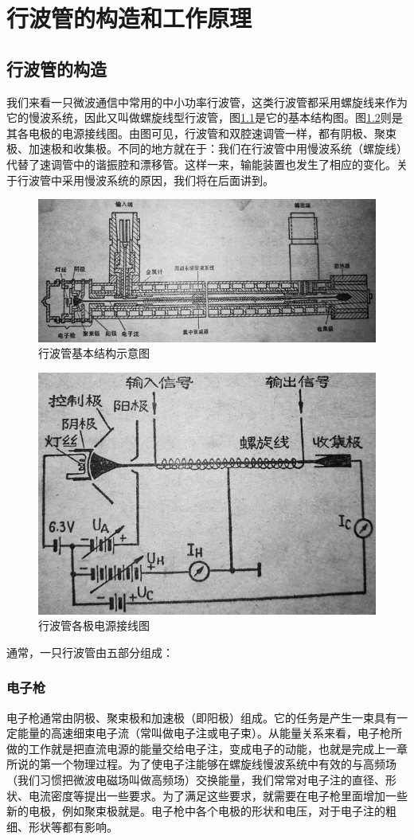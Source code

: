\chapter{行波管的构造和工作原理}
\section{行波管的构造}
我们来看一只微波通信中常用的中小功率行波管，这类行波管都采用螺旋线来作为它的慢波系统，因此又叫做螺旋线型行波管，图\ref{ch2-1}是它的基本结构图。图\ref{ch2-2}则是其各电极的电源接线图。由图可见，行波管和双腔速调管一样，都有阴极、聚束极、加速极和收集极。不同的地方就在于：我们在行波管中用慢波系统（螺旋线）代替了速调管中的谐振腔和漂移管。这样一来，输能装置也发生了相应的变化。关于行波管中采用慢波系统的原因，我们将在后面讲到。

\begin{figure}[phtb]
	\centering
	\includegraphics[width=\linewidth]{figure/ch2-1}
	\caption{行波管基本结构示意图}
	\label{ch2-1}
\end{figure}

\begin{figure}[phtb]
	\centering
	\includegraphics[width=0.65\linewidth]{figure/ch2-2}
	\caption{行波管各极电源接线图}
	\label{ch2-2}
\end{figure}

通常，一只行波管由五部分组成：
\subsection{电子枪}
电子枪通常由阴极、聚束极和加速极（即阳极）组成。它的任务是产生一束具有一定能量的高速细束电子流（常叫做电子注或电子束）。从能量关系来看，电子枪所做的工作就是把直流电源的能量交给电子注，变成电子的动能，也就是完成上一章所说的第一个物理过程。为了使电子注能够在螺旋线慢波系统中有效的与高频场（我们习惯把微波电磁场叫做高频场）交换能量，我们常常对电子注的直径、形状、电流密度等提出一些要求。为了满足这些要求，就需要在电子枪里面增加一些新的电极，例如聚束极就是。电子枪中各个电极的形状和电压，对于电子注的粗细、形状等都有影响。

